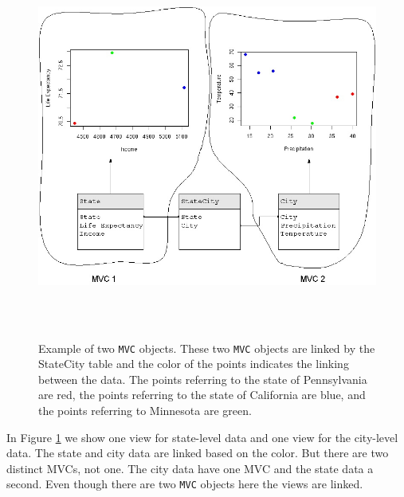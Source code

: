 \documentclass[11pt]{article}
\newcommand{\Robject}[1]{{\texttt{#1}}}
\begin{document}
\begin{figure}[ht]
  \begin{center}
    \includegraphics[height=5in, width=6in]{MultipleMVC.jpg}
    \caption{ Example of two \Robject{MVC} objects.  These two \Robject{MVC}
      objects are linked by the StateCity table and the color of the points
    indicates the linking between the data.  The points referring to the state
    of Pennsylvania are red, the points referring to the state of California
    are blue, and the points referring to Minnesota are green. }
    \label{Fig:MultMVC}
  \end{center}
\end{figure}

In Figure \ref{Fig:MultMVC} we show one view for state-level data and
one view for the city-level data.  The state and city data are linked
based on the color.  But there are two distinct MVCs, not one. 
The city data have one MVC and the state data a second.  Even though 
there are two \Robject{MVC} objects here the views are linked.

\end{document}

